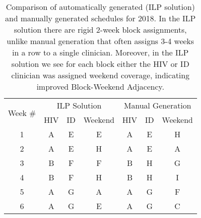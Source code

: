 \begin{table}[htbp]
  \centering
  \caption{Comparison of automatically generated (ILP solution) and manually generated schedules for 2018. In the ILP solution there are rigid 2-week block assignments, unlike manual generation that often assigns 3-4 weeks in a row to a single clinician. Moreover, in the ILP solution we see for each block either the HIV or ID clinician was assigned weekend coverage, indicating improved Block-Weekend Adjacency.}%
  \label{tbl:2018-schedule-comparison}%
	\begin{adjustbox}{scale=0.8}
    \begin{tabular}{c||ccc||ccc}
    \multicolumn{1}{c||}{\multirow{2}[1]{*}{Week \#}} & \multicolumn{3}{c||}{ILP Solution} & \multicolumn{3}{c}{Manual Generation} \\
          & HIV   & ID    & Weekend & HIV   & ID    & Weekend \\
    \midrule
    \midrule
    1     & \cellcolor[rgb]{ .663,  .816,  .557}A & \cellcolor[rgb]{ .957,  .69,  .518}E & \cellcolor[rgb]{ .957,  .69,  .518}E & \cellcolor[rgb]{ .663,  .816,  .557}A & \cellcolor[rgb]{ .957,  .69,  .518}E & \cellcolor[rgb]{ .459,  .443,  .443}H \\
    2     & \cellcolor[rgb]{ .663,  .816,  .557}A & \cellcolor[rgb]{ .957,  .69,  .518}E & \cellcolor[rgb]{ .459,  .443,  .443}H & \cellcolor[rgb]{ .663,  .816,  .557}A & \cellcolor[rgb]{ .957,  .69,  .518}E & \cellcolor[rgb]{ .663,  .816,  .557}A \\
    3     & \cellcolor[rgb]{ .608,  .761,  .902}B & \cellcolor[rgb]{ .557,  .663,  .859}F & \cellcolor[rgb]{ .557,  .663,  .859}F & \cellcolor[rgb]{ .608,  .761,  .902}B & \cellcolor[rgb]{ .459,  .443,  .443}H & \cellcolor[rgb]{ .518,  .592,  .69}G \\
    4     & \cellcolor[rgb]{ .608,  .761,  .902}B & \cellcolor[rgb]{ .557,  .663,  .859}F & \cellcolor[rgb]{ .459,  .443,  .443}H & \cellcolor[rgb]{ .608,  .761,  .902}B & \cellcolor[rgb]{ .459,  .443,  .443}H & \cellcolor[rgb]{ .251,  .251,  .251}\textcolor[rgb]{ 1,  1,  1}{I} \\
    5     & \cellcolor[rgb]{ .663,  .816,  .557}A & \cellcolor[rgb]{ .518,  .592,  .69}G & \cellcolor[rgb]{ .663,  .816,  .557}A & \cellcolor[rgb]{ .663,  .816,  .557}A & \cellcolor[rgb]{ .518,  .592,  .69}G & \cellcolor[rgb]{ .557,  .663,  .859}F \\
    6     & \cellcolor[rgb]{ .663,  .816,  .557}A & \cellcolor[rgb]{ .518,  .592,  .69}G & \cellcolor[rgb]{ .957,  .69,  .518}E & \cellcolor[rgb]{ .663,  .816,  .557}A & \cellcolor[rgb]{ .518,  .592,  .69}G & \cellcolor[rgb]{ 1,  .851,  .4}C \\

\end{tabular}
\end{adjustbox}
\end{table}
